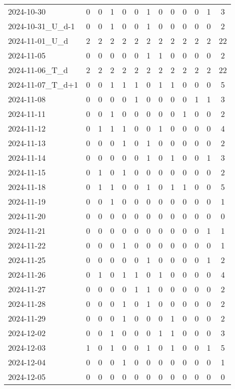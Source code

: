 \documentclass[dvipdfmx,oneside]{article}
\begin{document}
\begin{longtable}{lcccccccccccc}
2024-10-30 & 0 & 0 & 1 & 0 & 0 & 1 & 0 & 0 & 0 & 0 & 1 & 3 \\
2024-10-31\_U\_d-1 & 0 & 0 & 1 & 0 & 0 & 1 & 0 & 0 & 0 & 0 & 0 & 2 \\
2024-11-01\_U\_d & 2 & 2 & 2 & 2 & 2 & 2 & 2 & 2 & 2 & 2 & 2 & 22 \\
2024-11-05 & 0 & 0 & 0 & 0 & 0 & 1 & 1 & 0 & 0 & 0 & 0 & 2 \\
2024-11-06\_T\_d & 2 & 2 & 2 & 2 & 2 & 2 & 2 & 2 & 2 & 2 & 2 & 22 \\
2024-11-07\_T\_d+1 & 0 & 0 & 1 & 1 & 1 & 0 & 1 & 1 & 0 & 0 & 0 & 5 \\
2024-11-08 & 0 & 0 & 0 & 0 & 1 & 0 & 0 & 0 & 0 & 1 & 1 & 3 \\
2024-11-11 & 0 & 0 & 1 & 0 & 0 & 0 & 0 & 0 & 1 & 0 & 0 & 2 \\
2024-11-12 & 0 & 1 & 1 & 1 & 0 & 0 & 1 & 0 & 0 & 0 & 0 & 4 \\
2024-11-13 & 0 & 0 & 0 & 1 & 0 & 1 & 0 & 0 & 0 & 0 & 0 & 2 \\
2024-11-14 & 0 & 0 & 0 & 0 & 0 & 1 & 0 & 1 & 0 & 0 & 1 & 3 \\
2024-11-15 & 0 & 1 & 0 & 1 & 0 & 0 & 0 & 0 & 0 & 0 & 0 & 2 \\
2024-11-18 & 0 & 1 & 1 & 0 & 0 & 1 & 0 & 1 & 1 & 0 & 0 & 5 \\
2024-11-19 & 0 & 0 & 1 & 0 & 0 & 0 & 0 & 0 & 0 & 0 & 0 & 1 \\
2024-11-20 & 0 & 0 & 0 & 0 & 0 & 0 & 0 & 0 & 0 & 0 & 0 & 0 \\
2024-11-21 & 0 & 0 & 0 & 0 & 0 & 0 & 0 & 0 & 0 & 0 & 1 & 1 \\
2024-11-22 & 0 & 0 & 0 & 1 & 0 & 0 & 0 & 0 & 0 & 0 & 0 & 1 \\
2024-11-25 & 0 & 0 & 0 & 0 & 0 & 1 & 0 & 0 & 0 & 0 & 1 & 2 \\
2024-11-26 & 0 & 1 & 0 & 1 & 1 & 0 & 1 & 0 & 0 & 0 & 0 & 4 \\
2024-11-27 & 0 & 0 & 0 & 0 & 1 & 1 & 0 & 0 & 0 & 0 & 0 & 2 \\
2024-11-28 & 0 & 0 & 0 & 1 & 0 & 1 & 0 & 0 & 0 & 0 & 0 & 2 \\
2024-11-29 & 0 & 0 & 0 & 1 & 0 & 0 & 0 & 1 & 0 & 0 & 0 & 2 \\
2024-12-02 & 0 & 0 & 1 & 0 & 0 & 0 & 1 & 1 & 0 & 0 & 0 & 3 \\
2024-12-03 & 1 & 0 & 1 & 0 & 0 & 1 & 0 & 1 & 0 & 0 & 1 & 5 \\
2024-12-04 & 0 & 0 & 0 & 1 & 0 & 0 & 0 & 0 & 0 & 0 & 0 & 1 \\
2024-12-05 & 0 & 0 & 0 & 0 & 0 & 0 & 0 & 0 & 0 & 0 & 0 & 0 \\

\end{longtable}
\end{document}
